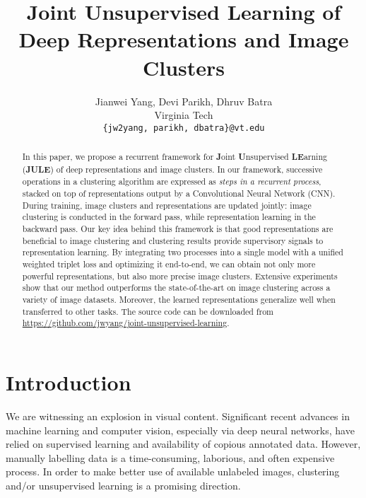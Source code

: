 \documentclass[10pt,twocolumn,letterpaper]{article}
\begin{document}
\title{{Joint Unsupervised Learning of Deep Representations and Image Clusters}}

\author{Jianwei Yang, Devi Parikh, Dhruv Batra\\
Virginia Tech\\
{\tt\small \{jw2yang, parikh, dbatra\}@vt.edu}
}

\maketitle


\begin{abstract}
In this paper, we propose a recurrent framework for \textbf{J}oint \textbf{U}nsupervised \textbf{LE}arning (\textbf{JULE}) of deep representations and image clusters. In our framework, {successive operations in a clustering algorithm} are expressed as \emph{{steps} in {a recurrent process}}, stacked on top of representations output by a Convolutional Neural Network (CNN). {During training, image clusters and representations are updated jointly: image clustering is conducted in the forward pass, while representation learning in the backward pass. Our key idea behind this framework is that good representations are beneficial to image clustering and clustering results provide supervisory {signals} to representation learning.} By integrating two processes into a single model with a unified {weighted triplet} loss and optimizing it end-to-end, we can obtain not only more powerful representations, but also more precise image clusters. Extensive experiments show that our method {outperforms} the state-of-the-art on image clustering across a variety of image datasets. Moreover, the learned representations generalize well when transferred to other tasks. {The source code can be downloaded from \url{https://github.com/jwyang/joint-unsupervised-learning}}.
\end{abstract}

\section{Introduction}
\label{Sec_Introduction}
We are witnessing an explosion in visual content. Significant recent advances in machine learning and computer vision, especially via deep neural networks, have relied on supervised learning and availability of copious annotated data. However, manually labelling data is a time-consuming, laborious, and often expensive process. In order to make better use of available unlabeled images, clustering and/or unsupervised learning is a promising direction.
\end{document}
